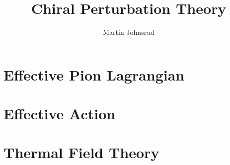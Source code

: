 \documentclass{article}
\title{Chiral Perturbation Theory}
\author{Martin Johnsrud}
\begin{document}
\maketitle 

\section{Effective Pion Lagrangian}





\section{Effective Action}






\section{Thermal Field Theory}












\end{document}

